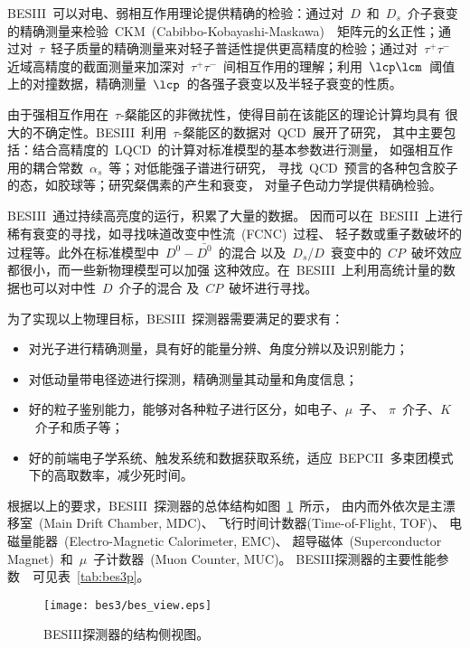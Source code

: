 BESIII~可以对电、弱相互作用理论提供精确的检验：通过对~$D$~和~$D_{s}$~介子衰变的精确测量来检验~CKM~(Cabibbo-Kobayashi-Maskawa)~\cite{CKM}~矩阵元的幺正性；通过对~$\tau$~轻子质量的精确测量来对轻子普适性提供更高精度的检验；通过对~$\tau^+\tau^-$~ 近域高精度的截面测量来加深对~$\tau^+\tau^-$~间相互作用的理解；利用~$\lcp\lcm$~阈值上的对撞数据，精确测量~$\lcp$~的各强子衰变以及半轻子衰变的性质。

由于强相互作用在~$\tau$-粲能区的非微扰性，使得目前在该能区的理论计算均具有
很大的不确定性。BESIII~利用~$\tau$-粲能区的数据对~QCD~展开了研究，
其中主要包括：结合高精度的~LQCD~的计算对标准模型的基本参数进行测量，
如强相互作用的耦合常数~$\alpha_{s}$~等；对低能强子谱进行研究，
寻找~QCD~预言的各种包含胶子的态，如胶球等；研究粲偶素的产生和衰变，
对量子色动力学提供精确检验。

BESIII~通过持续高亮度的运行，积累了大量的数据。
因而可以在~BESIII~上进行稀有衰变的寻找，如寻找味道改变中性流~(FCNC)~过程、
轻子数或重子数破坏的过程等。此外在标准模型中~$D^{0}-\bar{D^{0}}$~的混合
以及~$D_{s}$/$D$~衰变中的~$CP$~破坏效应都很小，而一些新物理模型可以加强
这种效应。在~BESIII~上利用高统计量的数据也可以对中性~$D$~介子的混合
及~$CP$~破坏进行寻找。

为了实现以上物理目标，BESIII~探测器需要满足的要求有：
\begin{itemize}
    \item 对光子进行精确测量，具有好的能量分辨、角度分辨以及识别能力；
    \item 对低动量带电径迹进行探测，精确测量其动量和角度信息；
    \item 好的粒子鉴别能力，能够对各种粒子进行区分，如电子、$\mu$~子、
        $\pi$~介子、$K$~介子和质子等；
    \item 好的前端电子学系统、触发系统和数据获取系统，适应~BEPCII~多束团模式
        下的高取数率，减少死时间。
\end{itemize}

根据以上的要求，BESIII~探测器的总体结构如图~\ref{fig:BESIII}~所示，
由内而外依次是主漂移室~(Main Drift Chamber, MDC)、
飞行时间计数器(Time-of-Flight, TOF)、
电磁量能器~(Electro-Magnetic Calorimeter, EMC)、
超导磁体~(Superconductor Magnet)~和~$\mu$~子计数器~(Muon Counter, MUC)。
BESIII探测器的主要性能参数~\cite{bes3}~可见表~\ref{tab:bes3p}。

\begin{figure}
 \centering
 \texttt{[image: bes3/bes\_view.eps]}
 \caption{BESIII探测器的结构侧视图。}
 \label{fig:BESIII}
\end{figure}

